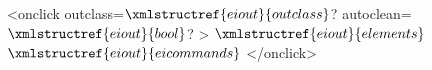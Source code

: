 <onclick outclass=$\xmlstructref{eiout}{outclass}$? autoclean=$\xmlstructref{eiout}{bool}$? >
  $\xmlstructref{eiout}{elements}$
  $\xmlstructref{eiout}{eicommands}$
</onclick>
